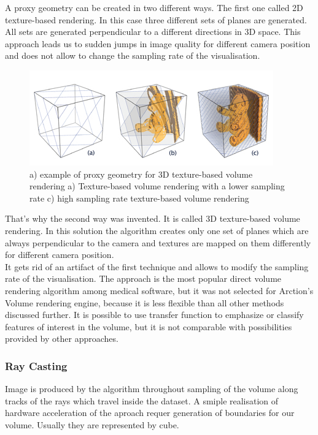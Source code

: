 \documentclass[twoside, english, 11pt]{report}
\begin{document}
A proxy geometry can be created in two different ways. The first one called 2D texture-based rendering. In this case three different sets of planes are generated. All sets are generated perpendicular to a different directions in 3D space. This approach leads us to sudden jumps in image quality for different camera position and does not allow to change the sampling rate of the visualisation.\\
\begin{figure}[H]
\centerline{
\includegraphics[scale=0.7]{img/texture-based}
}
\caption{a) example of proxy geometry for 3D texture-based volume rendering a) Texture-based volume rendering with a lower sampling rate c) high sampling rate texture-based volume rendering}
\end{figure}
That's why the second way was invented. It is called 3D texture-based volume rendering. In this solution the algorithm creates only one set of planes which are always perpendicular to the camera and textures are mapped on them differently for different camera position. \\

It gets rid of an artifact of the first technique and allows to modify the sampling rate of the visualisation. The approach is the most popular direct volume rendering algorithm among medical software, but it was not selected for Arction's Volume rendering engine, because it is less flexible than all other methods discussed further. It is possible to use transfer function to emphasize or classify features of interest in the volume, but it is not comparable with possibilities provided by other approaches.

\subsubsection{Ray Casting}

Image is produced by the algorithm throughout sampling of the volume along tracks of the rays which travel inside the dataset. A smiple realisation of hardware acceleration of the aproach requer generation of boundaries for our volume. Usually they are represented by cube. \\
\end{document}
